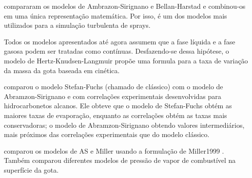  compararam os modelos de Ambrazon-Sirignano e Bellan-Harstad e combinou-os em uma única representação matemática.
Por isso, é um dos modelos mais utilizados para a simulação turbulenta de sprays.  

Todos os modelos apresentados até agora assumem que a fase líquida e a fase gasosa podem ser tratadas como contínuas.
Desfazendo-se dessa hipótese, o modelo de Hertz-Knudsen-Langmuir  propõe uma formula para a taxa de variação da massa da gota baseada em cinética.

 comparou o modelo Stefan-Fuchs (chamado de clássico) com o modelo de Abramzon-Sirignano e com correlações experimentais desenvolvidas para hidrocarbonetos alcanos.
Ele obteve que o modelo de Stefan-Fuchs obtém as maiores taxas de evaporação, enquanto as correlações obtém as taxas mais conservadoras; o modelo de Abramzon-Sirignano obtendo valores intermediários, mais próximos das correlações experimentais que do modelo clássico.


 comparou os modelos de AS e Miller usando a formulação de Miller1999 . 
Também comparou diferentes modelos de pressão de vapor de combustível na superfície da gota.


